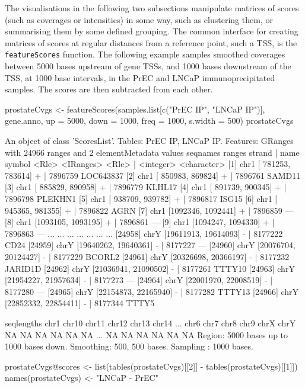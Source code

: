 The visualisations in the following two subsections manipulate matrices of scores (such as coverages or intensities) in some way, such as clustering them, or summarising them by some defined grouping. The common interface for creating matrices of scores at regular distances from a reference point, such a TSS, is the \texttt{featureScores} function. The following example samples smoothed coverages between 5000 bases upstream of gene TSSs, and 1000 bases downstream of the TSS, at 1000 base intervals, in the PrEC and LNCaP immunoprecipitated samples. The scores are then subtracted from each other.

\begin{Schunk}
\begin{Sinput}
 prostateCvgs <- featureScores(samples.list[c("PrEC IP", "LNCaP IP")], 
     gene.anno, up = 5000, down = 1000, freq = 1000, s.width = 500)
 prostateCvgs
\end{Sinput}
\begin{Soutput}
An object of class 'ScoresList'.
Tables: PrEC IP, LNCaP IP.
Features:
GRanges with 24966 ranges and 2 elementMetadata values
        seqnames               ranges strand   |      name      symbol
           <Rle>            <IRanges>  <Rle>   | <integer> <character>
    [1]     chr1   [ 781253,  783614]      +   |   7896759   LOC643837
    [2]     chr1   [ 850983,  869824]      +   |   7896761      SAMD11
    [3]     chr1   [ 885829,  890958]      +   |   7896779      KLHL17
    [4]     chr1   [ 891739,  900345]      +   |   7896798     PLEKHN1
    [5]     chr1   [ 938709,  939782]      +   |   7896817       ISG15
    [6]     chr1   [ 945365,  981355]      +   |   7896822        AGRN
    [7]     chr1   [1092346, 1092441]      +   |   7896859         ---
    [8]     chr1   [1093105, 1093195]      +   |   7896861         ---
    [9]     chr1   [1094247, 1094330]      +   |   7896863         ---
    ...      ...                  ...    ... ...       ...         ...
[24958]     chrY [19611913, 19614093]      -   |   8177222        CD24
[24959]     chrY [19640262, 19640361]      -   |   8177227         ---
[24960]     chrY [20076704, 20124427]      -   |   8177229      BCORL2
[24961]     chrY [20326698, 20366197]      -   |   8177232     JARID1D
[24962]     chrY [21036941, 21090502]      -   |   8177261      TTTY10
[24963]     chrY [21954227, 21957634]      -   |   8177273         ---
[24964]     chrY [22001970, 22008519]      -   |   8177280         ---
[24965]     chrY [22154873, 22165940]      -   |   8177282      TTTY13
[24966]     chrY [22852332, 22854411]      -   |   8177344       TTTY5

seqlengths
  chr1 chr10 chr11 chr12 chr13 chr14 ...  chr6  chr7  chr8  chr9  chrX  chrY
    NA    NA    NA    NA    NA    NA ...    NA    NA    NA    NA    NA    NA
Region: 5000 bases up to 1000 bases down.
Smoothing: 500, 500 bases.
Sampling : 1000 bases.
\end{Soutput}
\begin{Sinput}
 prostateCvgs@scores <- list(tables(prostateCvgs)[[2]] - tables(prostateCvgs)[[1]])
 names(prostateCvgs) <- "LNCaP - PrEC"
\end{Sinput}
\end{Schunk}

